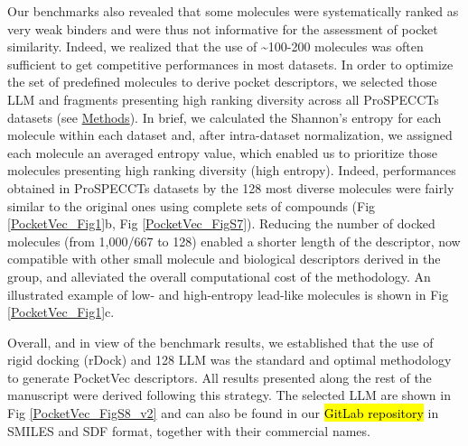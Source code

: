 Our benchmarks also revealed that some molecules were systematically ranked as very weak binders and were thus not informative for the assessment of pocket similarity. Indeed, we realized that the use of \textasciitilde100-200 molecules was often sufficient to get competitive performances in most datasets. In order to optimize the set of predefined molecules to derive pocket descriptors, we selected those LLM and fragments presenting high ranking diversity across all ProSPECCTs datasets (see \hyperref[PocketVec_Methods]{Methods}). In brief, we calculated the Shannon’s entropy for each molecule within each dataset and, after intra-dataset normalization, we assigned each molecule an averaged entropy value, which enabled us to prioritize those molecules presenting high ranking diversity (high entropy). Indeed, performances obtained in ProSPECCTs datasets by the 128 most diverse molecules were fairly similar to the original ones using complete sets of compounds (Fig \ref{PocketVec_Fig1}b, Fig \ref{PocketVec_FigS7}). Reducing the number of docked molecules (from 1,000/667 to 128) enabled a shorter length of the descriptor, now compatible with other small molecule and biological descriptors derived in the group\cite{fernandez-torras_integrating_2022, duran-frigola_extending_2020, bertoni_bioactivity_2021}, and alleviated the overall computational cost of the methodology. An illustrated example of low- and high-entropy lead-like molecules is shown in Fig \ref{PocketVec_Fig1}c.

Overall, and in view of the benchmark results, we established that the use of rigid docking (rDock) and 128 LLM was the standard and optimal methodology to generate PocketVec descriptors. All results presented along the rest of the manuscript were derived following this strategy. The selected LLM are shown in Fig \ref{PocketVec_FigS8_v2} and can also be found in our \hl{GitLab repository} in SMILES and SDF format, together with their commercial names. 



